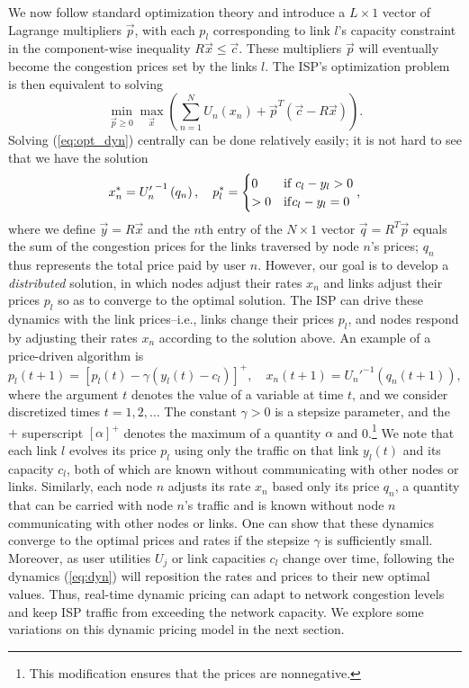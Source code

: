 We now follow standard optimization theory and introduce a $L\times 1$ vector of Lagrange multipliers $\vec{p}$, with each $p_l$ corresponding to link $l$'s capacity constraint in the component-wise inequality $R\vec{x}\leq \vec{c}$. These multipliers $\vec{p}$ will eventually become the congestion prices set by the links $l$. The ISP's optimization problem is then equivalent to solving
\begin{equation}
\min_{\vec{p}\geq 0}\max_{\vec{x}}\left(\sum_{n = 1}^N U_n(x_n) + \vec{p}^T\left(\vec{c} - R\vec{x}\right)\right).
\label{eq:opt_dyn}
\end{equation}
Solving (\ref{eq:opt_dyn}) centrally can be done relatively easily; it is not hard to see that we have the solution
\begin{equation*}
x_n^\ast = {U_n'}^{-1}\left(q_n\right),\quad p_l^\ast = \begin{cases} 0 &{\rm if}\;c_l - y_l > 0 \\ > 0 &{\rm if} c_l - y_l = 0 \end{cases},
\end{equation*}
where we define $\vec{y} = R\vec{x}$ and the $n$th entry of the $N\times 1$ vector $\vec{q} = R^T\vec{p}$ equals the sum of the congestion prices for the links traversed by node $n$'s prices; $q_n$ thus represents the total price paid by user $n$. However, our goal is to develop a \emph{distributed} solution, in which nodes adjust their rates $x_n$ and links adjust their prices $p_l$ so as to converge to the optimal solution. The ISP can drive these dynamics with the link prices--i.e., links change their prices $p_l$, and nodes respond by adjusting their rates $x_n$ according to the solution above. An example of a price-driven algorithm is \cite{low1999optimization}
\begin{equation}
p_l(t + 1) = \left[p_l(t) - \gamma \left(y_l(t) - c_l\right)\right]^+,\quad x_n(t + 1) = {U_n'}^{-1}\left(q_n(t + 1)\right),
\label{eq:dyn}
\end{equation}
where the argument $t$ denotes the value of a variable at time $t$, and we consider discretized times $t = 1,2,\ldots$ The constant $\gamma > 0$ is a stepsize parameter, and the $+$ superscript $\left[\alpha\right]^+$ denotes the maximum of a quantity $\alpha$ and 0.\footnote{This modification ensures that the prices are nonnegative.} We note that each link $l$ evolves its price $p_l$ using only the traffic on that link $y_l(t)$ and its capacity $c_l$, both of which are known without communicating with other nodes or links. Similarly, each node $n$ adjusts its rate $x_n$ based only its price $q_n$, a quantity that can be carried with node $n$'s traffic and is known without node $n$ communicating with other nodes or links. One can show that these dynamics converge to the optimal prices and rates if the stepsize $\gamma$ is sufficiently small. Moreover, as user utilities $U_j$ or link capacities $c_l$ change over time, following the dynamics (\ref{eq:dyn}) will reposition the rates and prices to their new optimal values. Thus, real-time dynamic pricing can adapt to network congestion levels and keep ISP traffic from exceeding the network capacity. We explore some variations on this dynamic pricing model in the next section.

